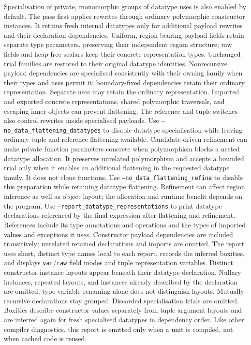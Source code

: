 \documentclass[12pt]{book}
\begin{document}
Specialisation of private, monomorphic groups of datatype uses is also enabled
by default. The pass first applies rewrites through ordinary polymorphic
constructor instances. It retains fresh internal datatypes only for additional
payload rewrites and their declaration dependencies. Uniform, region-bearing
payload fields retain separate type parameters, preserving their independent
region structure; raw fields and heap-free scalars keep their concrete
representation types. Unchanged trial families are restored to their original
datatype identities. Nonrecursive payload dependencies are specialised
consistently with their owning family when their types and uses permit it;
boundary-fixed dependencies retain their ordinary representation.
Separate uses may retain the ordinary
representation. Imported and exported concrete representations, shared
polymorphic traversals, and escaping inner objects can prevent flattening.
The reference and tuple switches also control rewrites inside specialised
payloads. Use \texttt{--no\_data\_flattening\_datatypes} to disable datatype
specialisation while leaving ordinary tuple and reference flattening available.
Candidate-driven refinement can make private function parameters concrete when
polymorphism blocks a nested datatype allocation. It preserves unrelated
polymorphism and accepts a bounded trial only when it enables an additional
flattening in the requested datatype family. It does not clone functions.
Use \texttt{--no\_data\_flattening\_refine} to disable this preparation while
retaining datatype flattening. Refinement can affect region inference as well
as object layout; the allocation and runtime benefit depends on the program.
Use \texttt{--report\_datatype\_representations} to print datatype declarations
referenced by the final expression after flattening and refinement. References
include its type annotations and operations and the types of imported values
and exceptions it uses. Constructor payload dependencies are included
transitively; unrelated retained declarations and imports are omitted. The report uses short, distinct
type names local to each report, records the inferred boxities, and displays
\texttt{var}/\texttt{raw} field modes and tuple representation variables.
Distinct constructor-instance layouts appear beneath their datatype declaration.
Nullary instances, repeated layouts, and instances already described by the
declaration are omitted; type-variable renaming alone does not distinguish
layouts. Mutually recursive declarations stay grouped. Discarded specialisation
trials are omitted. Boxities describe constructor values separately from tuple
argument layouts and are inferred again for fresh specialised datatypes in
dependency order. Like other compiler diagnostics, this report is emitted only
when a unit is compiled, not when cached code is reused.
\end{document}
